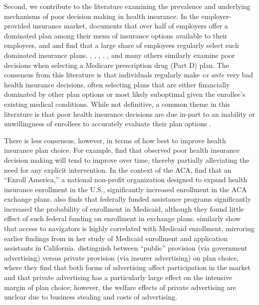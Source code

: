 \documentclass[12pt]{article}
\begin{document}
Second, we contribute to the literature examining the prevalence and underlying mechanisms of poor decision making in health insurance. In the employer-provided insurance market, \cite{liu2021} documents that over half of employers offer a dominated plan among their menu of insurance options available to their employees, and \cite{sinaiko2011} and \cite{bhargava2017} find that a large share of employees regularly select such dominated insurance plans. \cite{abaluck2011}, \cite{ketcham2012}, \cite{zhou2012}, \cite{heiss2013}, \cite{gruber2017}, \cite{ho2017rand} and many others similarly examine poor decisions when selecting a Medicare prescription drug (Part D) plan. The consensus from this literature is that individuals regularly make \textit{ex ante} very bad health insurance decisions, often selecting plans that are either financially dominated by other plan options or most likely suboptimal given the enrollee's existing medical conditions. While not definitive, a common theme in this literature is that poor health insurance decisions are due in-part to an inability or unwillingness of enrollees to accurately evaluate their plan options \citep{bhargava2017, hanoch2009}. 

There is less consensus, however, in terms of how best to improve health insurance plan choice. For example, \cite{ketcham2012} find that observed poor health insurance decision making will tend to improve over time, thereby partially alleviating the need for any explicit intervention. In the context of the ACA, \cite{orzol2018} find that an ``Enroll America,'' a national non-profit organization designed to expand health insurance enrollment in the U.S., significantly increased enrollment in the ACA exchange plans. \cite{myerson2019} also finds that federally funded assistance programs significantly increased the probability of enrollment in Medicaid, although they found little effect of such federal funding on enrollment in exchange plans. \cite{sommers2015} similarly show that access to navigators is highly correlated with Medicaid enrollment, mirroring earlier findings from \cite{aizer2003} in her study of Medicaid enrollment and application assistants in California. \cite{aizawa2021} distinguish between ``public'' provision (via government advertising) versus private provision (via insurer advertising) on plan choice, where they find that both forms of advertising affect participation in the market and that private advertising has a particularly large effect on the intensive margin of plan choice; however, the welfare effects of private advertising are unclear due to business stealing and costs of advertising.
\end{document}
